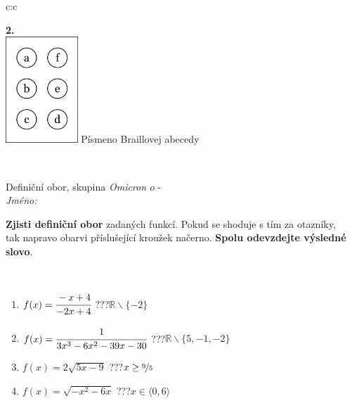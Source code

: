 \documentclass[10pt]{report}
\newcommand\omicron{o}
\begin{document}
\begin{tabular}{c:c}
\begin{minipage}[c][104.5mm][t]{0.5\linewidth}
\begin{center}
\begin{minipage}{0.20\linewidth}
\begin{center}
{\Huge\bfseries 2.} \\[2mm]
\includegraphics[height=40mm]{../images/braille.png}
{\small Písmeno Braillovej abecedy}
\end{center}
\end{minipage}
\end{center}
\end{minipage}
\\ \hdashline
\begin{minipage}[c][104.5mm][t]{0.5\linewidth}
\begin{center}
\vspace{7mm}
{\huge Definiční obor, skupina \textit{Omicron $\omicron$} -}\\[5mm]
\textit{Jméno:}\phantom{xxxxxxxxxxxxxxxxxxxxxxxxxxxxxxxxxxxxxxxxxxxxxxxxxxxxxxxxxxxxxxxxx}\\[5mm]
\begin{minipage}{0.95\linewidth}
\begin{center}
\textbf{Zjisti definiční obor} zadaných funkcí. Pokud se shoduje s tím za otazníky,\\tak napravo obarvi příslušející kroužek načerno. \textbf{Spolu odevzdejte výsledné slovo}.
\end{center}
\end{minipage}
\\[1mm]
\begin{minipage}{0.79\linewidth}
\begin{center}
\begin{varwidth}{\linewidth}
\begin{enumerate}
\normalsizerrr
\item $f(x)=\cfrac{-x+4}{-2x+4}$\quad \dotfill\; ???\;\dotfill \quad $\mathbb{R}\smallsetminus\{-2\}$
\item $f(x)=\cfrac{1}{3x^3-6x^2-39x-30}$\quad \dotfill\; ???\;\dotfill \quad $\mathbb{R}\smallsetminus\{5,-1,-2\}$
\item $f(x)=2\sqrt{5x-9}$\quad \dotfill\; ???\;\dotfill \quad $x\geq\nicefrac{9}{5}$
\item $f(x)=\sqrt{-x^2-6x}$\quad \dotfill\; ???\;\dotfill \quad $x\in\langle0 , 6\rangle$

\end{enumerate}
\end{varwidth}
\end{center}
\end{minipage}
\end{center}
\end{minipage}
\end{tabular}
\end{document}
